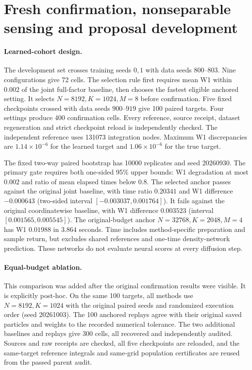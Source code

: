 \section{Fresh confirmation, nonseparable sensing and proposal development}
\label{app:paper-level-results}

\paragraph{Learned-cohort design.}
The development set crosses training seeds $0,1$ with data seeds $800$--$803$. Nine configurations give 72 cells. The selection rule first requires mean W1 within $0.002$ of the joint full-factor baseline, then chooses the fastest eligible anchored setting. It selects $N=8192,K=1024,M=8$ before confirmation. Five fixed checkpoints crossed with data seeds $900$--$919$ give 100 paired targets. Four settings produce 400 confirmation cells. Every reference, source receipt, dataset regeneration and strict checkpoint reload is independently checked. The independent reference uses 131073 integration nodes. Maximum W1 discrepancies are $1.14\times10^{-6}$ for the learned target and $1.06\times10^{-6}$ for the true target.

The fixed two-way paired bootstrap has 10000 replicates and seed 20260930. The primary gate requires both one-sided 95\% upper bounds: W1 degradation at most $0.002$ and ratio of mean elapsed times below $0.8$. The selected anchor passes against the original joint baseline, with time ratio $0.20341$ and W1 difference $-0.000643$ (two-sided interval $[-0.003037,0.001764]$). It fails against the original coordinatewise baseline, with W1 difference $0.003523$ (interval $[0.001565,0.005545]$). The original-budget anchor $N=32768,K=2048,M=4$ has W1 $0.01988$ in $3.864$ seconds. Time includes method-specific preparation and sample return, but excludes shared references and one-time density-network prediction. These networks do not evaluate neural scores at every diffusion step.

\paragraph{Equal-budget ablation.}
This comparison was added after the original confirmation results were visible. It is explicitly post-hoc. On the same 100 targets, all methods use $N=8192,K=1024$ with the original paired seeds and randomized execution order (seed 20261003). The 100 anchored replays agree with their original saved particles and weights to the recorded numerical tolerance. The two additional baselines and replays give 300 cells, all recovered and independently audited. Sources and raw receipts are checked, all five checkpoints are reloaded, and the same-target reference integrals and same-grid population certificates are reused from the passed parent audit.

